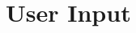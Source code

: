 \documentclass[../../../../main.tex]{subfiles}
\begin{document}
\section{User Input}

\newpage
\end{document}
